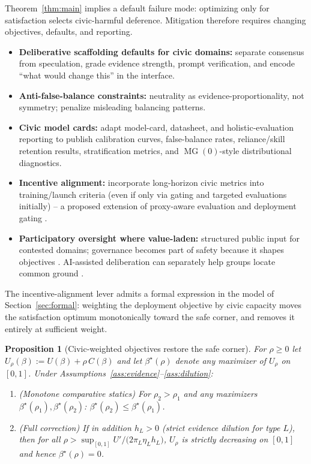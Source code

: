\documentclass[11pt]{article}
\newtheorem{proposition}[theorem]{Proposition}
\theoremstyle{definition}
\theoremstyle{remark}
\numberwithin{equation}{section}
\DeclareMathOperator{\MG}{MG}
\begin{document}
Theorem~\ref{thm:main} implies a default failure mode: optimizing only for satisfaction selects civic-harmful deference. Mitigation therefore requires changing objectives, defaults, and reporting.
\begin{itemize}
  \item \textbf{Deliberative scaffolding defaults for civic domains:} separate consensus from speculation, grade evidence strength, prompt verification, and encode ``what would change this'' in the interface.
  \item \textbf{Anti-false-balance constraints:} neutrality as evidence-proportionality, not symmetry; penalize misleading balancing patterns.
  \item \textbf{Civic model cards:} adapt model-card, datasheet, and holistic-evaluation reporting \citep{mitchell2019model, gebru2021datasheets, liang2023holistic} to publish calibration curves, false-balance rates, reliance/skill retention results, stratification metrics, and $\MG(0)$-style distributional diagnostics.
  \item \textbf{Incentive alignment:} incorporate long-horizon civic metrics into training/launch criteria (even if only via gating and targeted evaluations initially) -- a proposed extension of proxy-aware evaluation and deployment gating \citep{gao2023scaling, shevlane2023model}.
  \item \textbf{Participatory oversight where value-laden:} structured public input for contested domains; governance becomes part of safety because it shapes objectives \citep{huang2024collective}. AI-assisted deliberation can separately help groups locate common ground \citep{tessler2024ai}.
\end{itemize}

The incentive-alignment lever admits a formal expression in the model of Section~\ref{sec:formal}: weighting the deployment objective by civic capacity moves the satisfaction optimum monotonically toward the safe corner, and removes it entirely at sufficient weight.

\begin{proposition}[Civic-weighted objectives restore the safe corner]\label{prop:incentive}
For $\rho \ge 0$ let $U_\rho(\beta) := U(\beta) + \rho\, C(\beta)$ and let $\beta^\star(\rho)$ denote any maximizer of $U_\rho$ on $[0,1]$. Under Assumptions~\ref{ass:evidence}--\ref{ass:dilution}:
\begin{enumerate}
  \item[(i)] (\emph{Monotone comparative statics}) For $\rho_2 > \rho_1$ and any maximizers $\beta^\star(\rho_1), \beta^\star(\rho_2)$: $\beta^\star(\rho_2) \le \beta^\star(\rho_1)$.
  \item[(ii)] (\emph{Full correction}) If in addition $h_L > 0$ (strict evidence dilution for type $L$), then for all $\rho > \sup_{[0,1]} U' \big/ \bigl(2\pi_L \eta_L h_L\bigr)$, $U_\rho$ is strictly decreasing on $[0,1]$ and hence $\beta^\star(\rho) = 0$.
\end{enumerate}
\end{proposition}
\end{document}
